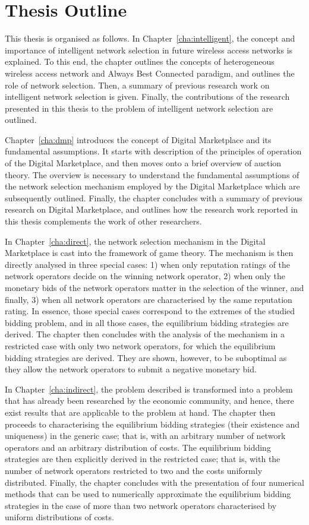 \section{Thesis Outline} %
\label{sec:thesis_outline_introduction}
This thesis is organised as follows. In Chapter~\ref{cha:intelligent}, the concept and importance of intelligent network selection in future wireless access networks is explained. To this end, the chapter outlines the concepts of heterogeneous wireless access network and Always Best Connected paradigm, and outlines the role of network selection. Then, a summary of previous research work on intelligent network selection is given. Finally, the contributions of the research presented in this thesis to the problem of intelligent network selection are outlined.

Chapter~\ref{cha:dmp} introduces the concept of Digital Marketplace and its fundamental assumptions. It starts with description of the principles of operation of the Digital Marketplace, and then moves onto a brief overview of auction theory. The overview is necessary to understand the fundamental assumptions of the network selection mechanism employed by the Digital Marketplace which are subsequently outlined. Finally, the chapter concludes with a summary of previous research on Digital Marketplace, and outlines how the research work reported in this thesis complements the work of other researchers.

In Chapter~\ref{cha:direct}, the network selection mechanism in the Digital Marketplace is cast into the framework of game theory. The mechanism is then directly analysed in three special cases: 1) when only reputation ratings of the network operators decide on the winning network operator, 2) when only the monetary bids of the network operators matter in the selection of the winner, and finally, 3) when all network operators are characterised by the same reputation rating. In essence, those special cases correspond to the extremes of the studied bidding problem, and in all those cases, the equilibrium bidding strategies are derived. The chapter then concludes with the analysis of the mechanism in a restricted case with only two network operators, for which the equilibrium bidding strategies are derived. They are shown, however, to be suboptimal as they allow the network operators to submit a negative monetary bid.

In Chapter~\ref{cha:indirect}, the problem described is transformed into a problem that has already been researched by the economic community, and hence, there exist results that are applicable to the problem at hand. The chapter then proceeds to characterising the equilibrium bidding strategies (their existence and uniqueness) in the generic case; that is, with an arbitrary number of network operators and an arbitrary distribution of costs. The equilibrium bidding strategies are then explicitly derived in the restricted case; that is, with the number of network operators restricted to two and the costs uniformly distributed. Finally, the chapter concludes with the presentation of four numerical methods that can be used to numerically approximate the equilibrium bidding strategies in the case of more than two network operators characterised by uniform distributions of costs.

